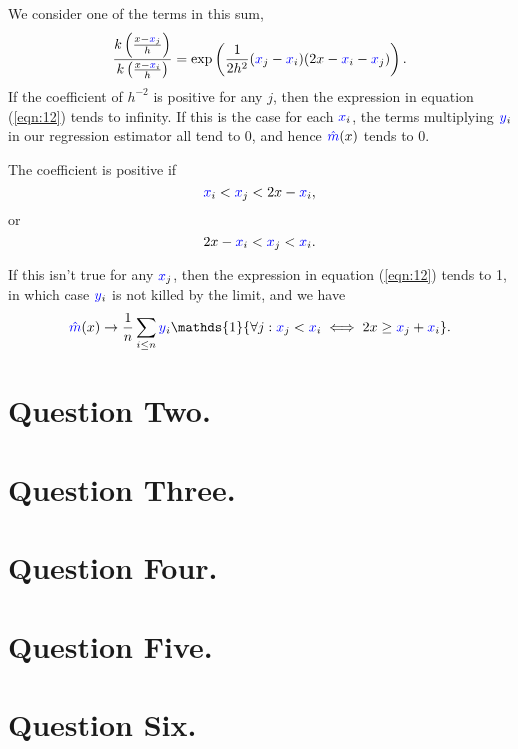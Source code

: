 \documentclass{article}
\renewcommand{\r}[1]{\textcolor{blue}{#1}}
\begin{document}
We consider one of the terms in this sum,
\begin{equation} \frac{k\left(\frac{x-\r{x}_{j}}{h}\right)}{k\left(\frac{x-\r{x}_{i}}{h}\right)} = \exp\left(\frac{1}{2h^{2}}(\r{x}_{j}-\r{x}_{i})(2x-\r{x}_{i}-\r{x}_{j})\right).\end{equation}
If the coefficient of $h^{-2}$ is positive for any $j$, then the expression in equation (\ref{eqn:12}) tends to infinity. If this is the case for each $\r{x}_{i}$, the terms multiplying $\r{y}_{i}$ in our regression estimator all tend to 0, and hence $\r{\hat{m}}(x)$ tends to 0.

The coefficient is positive if
\begin{equation} \r{x}_{i}<\r{x}_{j}<2x-\r{x}_{i},\end{equation}
or
\begin{equation} 2x-\r{x}_{i}<\r{x}_{j}<\r{x}_{i}.\end{equation}

If this isn't true for any $\r{x}_{j}$, then the expression in equation (\ref{eqn:12}) tends to 1, in which case $\r{y}_{i}$ is not killed by the limit, and we have
\begin{equation} \r{\hat{m}}(x) \to \frac{1}{n}\sum_{i\leq n} \r{y}_{i}\mathds{1}\{\forall j: \r{x}_{j}<\r{x}_{i} \iff 2x\geq \r{x}_{j}+\r{x}_{i}\}.\end{equation}

\section{Question Two.}




\section{Question Three.}




\section{Question Four.}




\section{Question Five.}




\section{Question Six.}
\end{document}
